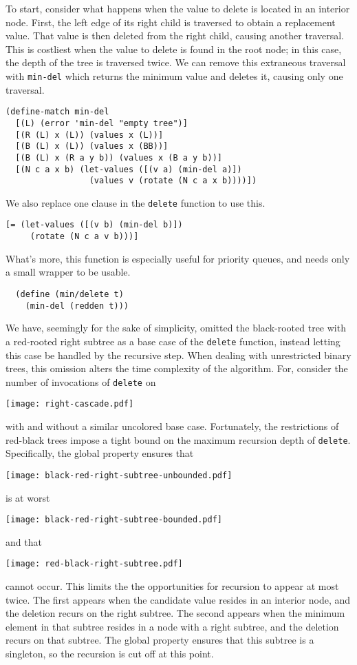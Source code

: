 \documentclass[preprint]{sigplanconf}
\begin{document}
To start, consider what happens when the value to delete is located in an interior node. First, the left edge of its right child is traversed to obtain a replacement value. That value is then deleted from the right child, causing another traversal. This is costliest when the value to delete is found in the root node; in this case, the depth of the tree is traversed twice. We can remove this extraneous traversal with \texttt{min-del} which returns the minimum value and deletes it, causing only one traversal.
\begin{verbatim}
(define-match min-del
  [(L) (error 'min-del "empty tree")]
  [(R (L) x (L)) (values x (L))]
  [(B (L) x (L)) (values x (BB))]
  [(B (L) x (R a y b)) (values x (B a y b))]
  [(N c a x b) (let-values ([(v a) (min-del a)])
                 (values v (rotate (N c a x b))))])
\end{verbatim}
We also replace one clause in the \texttt{delete} function to use this.
\begin{verbatim}
[= (let-values ([(v b) (min-del b)])
     (rotate (N c a v b)))]
\end{verbatim}

What's more, this function is especially useful for priority queues, and needs only a small wrapper to be usable.
\begin{verbatim}
  (define (min/delete t)
    (min-del (redden t)))
\end{verbatim}

We have, seemingly for the sake of simplicity, omitted the black-rooted tree with a red-rooted right subtree as a base case of the \texttt{delete} function, instead letting this case be handled by the recursive step. When dealing with unrestricted binary trees, this omission alters the time complexity of the algorithm. For, consider the number of invocations of \texttt{delete} on
\begin{center}
\texttt{[image: right-cascade.pdf]}
\end{center}
with and without a similar uncolored base case. Fortunately, the restrictions of red-black trees impose a tight bound on the maximum recursion depth of \texttt{delete}. Specifically, the global property ensures that
\begin{center}
\texttt{[image: black-red-right-subtree-unbounded.pdf]}
\end{center}
is at worst
\begin{center}
\texttt{[image: black-red-right-subtree-bounded.pdf]}
\end{center}
and that
\begin{center}
\texttt{[image: red-black-right-subtree.pdf]}
\end{center}
cannot occur. This limits the the opportunities for recursion to appear at most twice. The first appears when the candidate value resides in an interior node, and the deletion recurs on the right subtree. The second appears when the minimum element in that subtree resides in a node with a right subtree, and the deletion recurs on that subtree. The global property ensures that this subtree is a singleton, so the recursion is cut off at this point.
\end{document}
